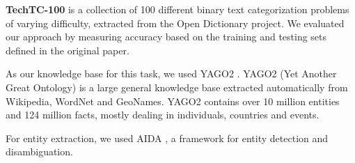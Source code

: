 \documentclass{article}
\theoremstyle{definition}
\begin{document}


\textbf{TechTC-100} \citep{gabrilovich2004text} is a collection of 100 different binary text categorization problems of varying difficulty, extracted from the Open Dictionary project.
We evaluated our approach by measuring accuracy based on the training and testing sets defined in the original paper. 

As our knowledge base for this task, we used YAGO2 \citep{hoffart2013yago2}.
YAGO2 (Yet Another Great Ontology) is a large general knowledge base extracted automatically from Wikipedia, WordNet and GeoNames.
YAGO2 contains over 10 million entities and 124 million facts, mostly dealing in individuals, countries and events.

For entity extraction, we used AIDA \citep{hoffart2011robust}, a framework for entity detection and disambiguation. %


\end{document}
